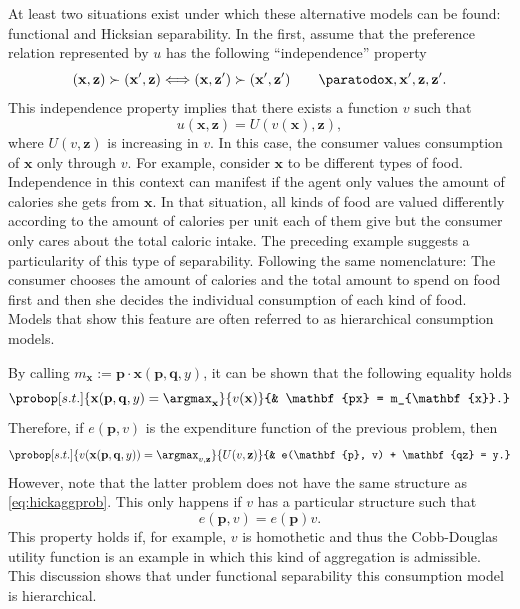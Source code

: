 \documentclass[english, a4paper, 12pt]{article}
\begin{document}
At least two situations exist under which these alternative models can be found: functional and Hicksian separability. In the first, assume that the preference relation represented by $u$ has the following ``independence'' property
	\begin{equation} \label{eq:indepPref}
		(\mathbf{x}, \mathbf{z}) \succ (\mathbf{x}', \mathbf{z}) 
			\Longleftrightarrow
		(\mathbf{x}, \mathbf{z}') \succ (\mathbf{x}', \mathbf{z}') \qquad \paratodo \mathbf{x}, \mathbf{x}', \mathbf{z}, \mathbf{z}'.
	\end{equation}
This independence property implies that there exists a function $v$ such that
	$$u(\mathbf{x}, \mathbf{z}) = U(v(\mathbf{x}), \mathbf{z}),$$
where $U(v,\mathbf{z})$ is increasing in $v$. In this case, the consumer values consumption of $\mathbf{x}$ only through $v$. For example, consider $\mathbf{x}$ to be different types of food. Independence in this context can manifest if the agent only values the amount of calories she gets from $\mathbf{x}$. In that situation, all kinds of food are valued differently according to the amount of calories per unit each of them give but the consumer only cares about the total caloric intake. The preceding example suggests a particularity of this type of separability. Following the same nomenclature: The consumer chooses the amount of calories and the total amount to spend on food first and then she decides the individual consumption of each kind of food. Models that show this feature are often referred to as hierarchical consumption models.

By calling $m_{\mathbf{x}} := \mathbf{p}\cdot \mathbf{x}(\mathbf{p}, \mathbf{q}, y)$, it can be shown that the following equality holds
	$$\probop[s.t.]{\mathbf{x}(\mathbf{p}, \mathbf{q}, y) = \argmax_{\mathbf{x}}}{v(\mathbf{x})}
					{&	\mathbf{px} = m_{\mathbf{x}}.}$$
Therefore, if $e(\mathbf{p}, v)$ is the expenditure function of the previous problem, then
	$$	\probop[s.t.]{v(\mathbf{x}(\mathbf{p}, \mathbf{q}, y)) = \argmax_{v, \mathbf{z}}}{U(v, \mathbf{z})}
				{&	e(\mathbf{p}, v) + \mathbf{qz} = y.}
	$$
However, note that the latter problem does not have the same structure as \eqref{eq:hickaggprob}. This only happens if $v$ has a particular structure such that 
	$$e(\mathbf{p}, v) = e(\mathbf{p})v.$$
This property holds if, for example, $v$ is homothetic and thus the Cobb-Douglas utility function is an example in which this kind of aggregation is admissible. This discussion shows that under functional separability this consumption model is hierarchical.
\end{document}
